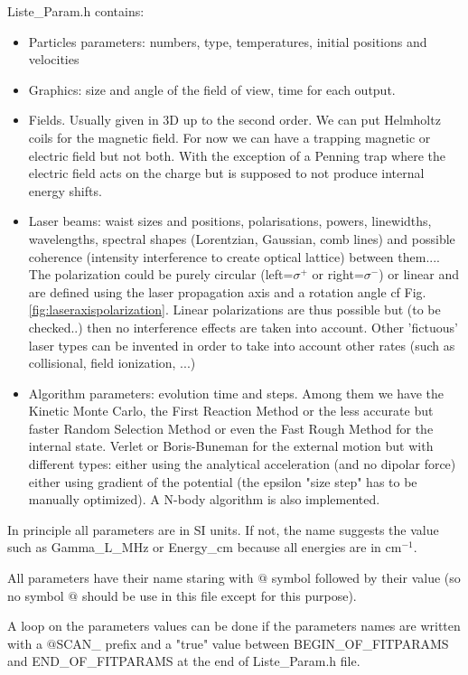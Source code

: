\documentclass[amsmath,amssymb,nofootinbib]{revtex4-2}
\begin{document}
Liste\_Param.h contains:
\begin{itemize}
	\item Particles parameters: numbers, type, temperatures, initial positions and velocities
	\item Graphics: size and angle of the field of view,  time for each output.
	\item Fields. Usually given in 3D up to the second order. We can put Helmholtz coils for the magnetic field. For now we can have a trapping magnetic or electric field but not both. With the exception of a Penning trap where the electric field acts on the charge but is supposed to not produce internal energy shifts.
	\item Laser beams:  waist sizes and positions, polarisations, powers, linewidths, wavelengths, spectral shapes (Lorentzian, Gaussian, comb lines) and possible coherence (intensity interference to create optical lattice) between them.... The polarization could be purely circular (left=$\sigma^+$ or right=$\sigma^-$) or linear and are defined using the laser propagation axis and a rotation angle cf Fig. \ref{fig:laseraxispolarization}. Linear polarizations are thus possible but (to be checked..) then no interference effects are taken into account. Other 'fictuous' laser types can be invented in order to take into account other rates (such as collisional, field ionization, ...)
		\item Algorithm parameters: evolution time and steps. Among them we have 
the Kinetic Monte Carlo, the First Reaction Method or the less accurate but faster Random Selection Method or even the Fast Rough Method for the internal state. Verlet or Boris-Buneman for the external motion but with different types: either using the analytical acceleration (and no dipolar force) either using gradient of the potential (the epsilon "size step" has to be manually optimized). A N-body algorithm is also implemented. 
  
\end{itemize}


In principle all parameters are in SI units. If not, the name suggests the value such as Gamma\_L\_MHz or Energy\_cm because all energies are in cm$^{-1}$.


All parameters have their name staring with $@$ symbol followed by their value (so no symbol $@$ should be use in this file except for this purpose).


A loop on the parameters values can be done if the parameters names are written with a
$@${}SCAN\_ prefix and a "true" value between 
BEGIN\_OF\_FITPARAMS
and 
END\_OF\_FITPARAMS
at the end of Liste\_Param.h file.
\end{document}
